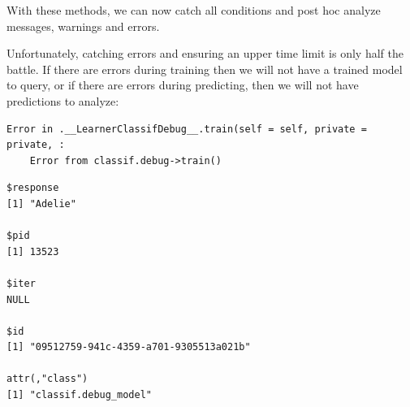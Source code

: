 With these methods, we can now catch all conditions and post hoc analyze
messages, warnings and errors.

Unfortunately, catching errors and ensuring an upper time limit is only
half the battle. If there are errors during training then we will not
have a trained model to query, or if there are errors during predicting,
then we will not have predictions to analyze:

\begin{Shaded}
\begin{Highlighting}[]
\NormalTok{(}\NormalTok{, } \NormalTok{)}\SpecialCharTok{$}\SpecialCharTok{$}
\end{Highlighting}
\end{Shaded}

\begin{verbatim}
Error in .__LearnerClassifDebug__.train(self = self, private = private, :
	Error from classif.debug->train()
\end{verbatim}

\begin{Shaded}
\begin{Highlighting}[]
\OtherTok{=} \NormalTok{(}\NormalTok{, } \NormalTok{)}\SpecialCharTok{$}
\SpecialCharTok{$}
\end{Highlighting}
\end{Shaded}

\begin{verbatim}
$response
[1] "Adelie"

$pid
[1] 13523

$iter
NULL

$id
[1] "09512759-941c-4359-a701-9305513a021b"

attr(,"class")
[1] "classif.debug_model"
\end{verbatim}

\begin{Shaded}
\begin{Highlighting}[]
\SpecialCharTok{$}
\end{Highlighting}
\end{Shaded}

